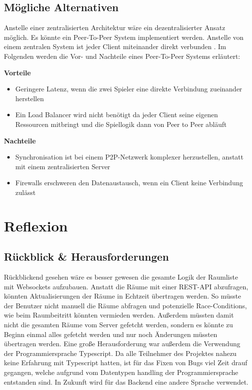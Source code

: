 \documentclass[
]{article}
\begin{document}
\subsection{Mögliche Alternativen}
Anstelle einer zentralisierten Architektur wäre ein dezentralisierter Ansatz möglich. Es könnte ein Peer-To-Peer System implementiert werden. Anstelle von einem zentralen System ist jeder Client miteinander direkt verbunden \cite{gordon2001distributed}. Im Folgenden werden die Vor- und Nachteile eines Peer-To-Peer Systems erläutert:

\textbf{Vorteile}
\begin{itemize}
\item Geringere Latenz, wenn die zwei Spieler eine direkte Verbindung zueinander herstellen
\item Ein Load Balancer wird nicht benötigt da jeder Client seine eigenen Ressourcen mitbringt und die Spiellogik dann von Peer to Peer abläuft
\end{itemize}

\textbf{Nachteile}
\begin{itemize}
\item Synchronisation ist bei einem P2P-Netzwerk komplexer herzustellen, anstatt mit einem zentralisierten Server
\item Firewalls \glqq erschweren\grqq{} den Datenaustausch, wenn ein Client keine Verbindung zulässt \cite{gordon2001distributed}
\end{itemize}

\section{Reflexion}

\subsection{Rückblick \& Herausforderungen}
Rückblickend gesehen wäre es besser gewesen die gesamte Logik der Raumliste mit Websockets aufzubauen. Anstatt die Räume mit einer REST-API abzufragen, könnten Aktualisierungen der Räume in Echtzeit übertragen werden. So müsste der Benutzer nicht manuell die Räume abfragen und potenzielle Race-Conditions, wie beim Raumbeitritt könnten vermieden werden. Außerdem müssten damit nicht die gesamten Räume vom Server gefetcht werden, sondern es könnte zu Beginn einmal alles gefetcht werden und nur noch Änderungen müssten übertragen werden.   
Eine große Herausforderung war außerdem die Verwendung der Programmiersprache Typescript. Da alle Teilnehmer des Projektes nahezu keine Erfahrung mit Typescript hatten, ist für das Fixen von Bugs viel Zeit drauf gegangen, welche aufgrund vom Datentypen handling der Programmiersprache entstanden sind. In Zukunft wird für das Backend eine andere Sprache verwendet.
\end{document}
